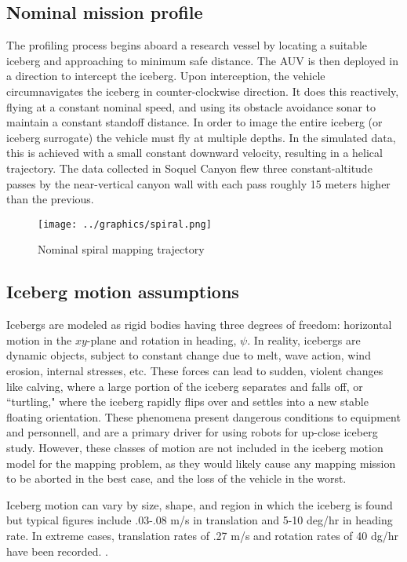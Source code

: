 \subsection{Nominal mission profile}

The profiling process begins aboard a research vessel by locating a suitable iceberg and approaching to minimum safe distance. The AUV is then deployed in a direction to intercept the iceberg. Upon interception, the vehicle circumnavigates the iceberg in counter-clockwise direction. It does this reactively, flying at a constant nominal speed, and using its obstacle avoidance sonar to maintain a constant standoff distance. In order to image the entire iceberg (or iceberg surrogate) the vehicle must fly at multiple depths. In the simulated data, this is achieved with a small constant downward velocity, resulting in a helical trajectory. The data collected in Soquel Canyon flew three constant-altitude passes by the near-vertical canyon wall with each pass roughly 15 meters higher than the previous. 

\begin{figure}[htb]
   \centering
   \texttt{[image: ../graphics/spiral.png]} %
   \caption{Nominal spiral mapping trajectory }
   \label{fig:NominalProfile}
\end{figure}

\subsection{Iceberg motion assumptions}

Icebergs are modeled as rigid bodies having three degrees of freedom: horizontal motion in the $xy$-plane and rotation in heading, $\psi$. In reality, icebergs are dynamic objects, subject to constant change due to melt, wave action, wind erosion, internal stresses, etc. These forces can lead to sudden, violent changes like calving, where a large portion of the iceberg separates and falls off, or ``turtling," where the iceberg rapidly flips over and settles into a new stable floating orientation. These phenomena present dangerous conditions to equipment and personnell, and are a primary driver for using robots for up-close iceberg study.  However, these classes of motion are not included in the iceberg motion model for the mapping problem, as they would likely cause any mapping mission to be aborted in the best case, and the loss of the vehicle in the worst.

Iceberg motion can vary by size, shape, and region in which the iceberg is found but typical figures include .03-.08 m/s in translation  and 5-10 deg/hr in heading rate. In extreme cases, translation rates of .27 m/s and rotation rates of 40 dg/hr have been recorded. \cite{?} \cite{?}. 

